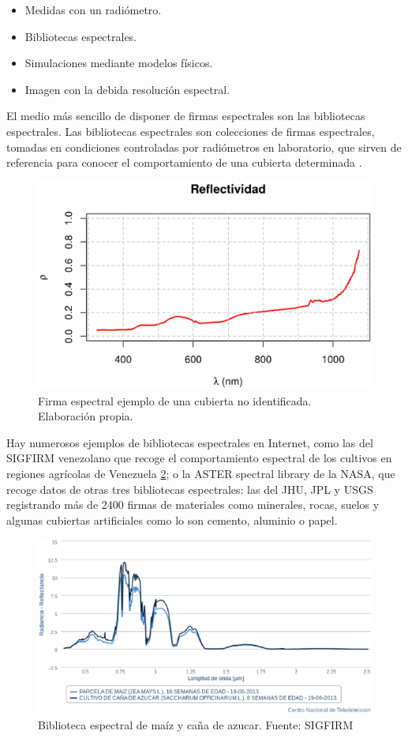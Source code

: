 \begin{itemize}
	\item Medidas con un radiómetro.
	\item Bibliotecas espectrales.
	\item Simulaciones mediante modelos físicos.
	\item Imagen con la debida resolución espectral.
\end{itemize}

El medio más sencillo de disponer de firmas espectrales son las bibliotecas espectrales. Las bibliotecas espectrales son colecciones de firmas espectrales, tomadas en condiciones controladas por radiómetros en laboratorio, que sirven de referencia para conocer el comportamiento de una cubierta determinada \citep{andinofase1}.

\begin{figure}
	\centering	
	\includegraphics[width=0.7\linewidth]{./Imagenes/Firma_espectral.eps}
	\caption[Firma espectral ejemplo]{Firma espectral ejemplo de una cubierta no identificada. Elaboración propia.}
	\label{fig:firma}
\end{figure}

Hay numerosos ejemplos de bibliotecas espectrales en Internet, como las del \ac{SIGFIRM} venezolano que recoge el comportamiento espectral de los cultivos en regiones agrícolas de Venezuela \ref{fig:biblioteca_esp}; o la ASTER spectral library de la NASA, que recoge datos de otras tres bibliotecas espectrales: las del \ac{JHU}, \ac{JPL} y \ac{USGS} registrando más de 2400 firmas de materiales como minerales, rocas, suelos y algunas cubiertas artificiales como lo son cemento, aluminio o papel.\Sep

\begin{figure}
	\centering
	\includegraphics[width=0.7\linewidth]{./Imagenes/biblioteca_espectral_SIGFIRM.eps}
	\caption[Biblioteca espectral SIGFIRM]{Biblioteca espectral de maíz y caña de azucar. Fuente: \ac{SIGFIRM}}
	\label{fig:biblioteca_esp}
\end{figure}

